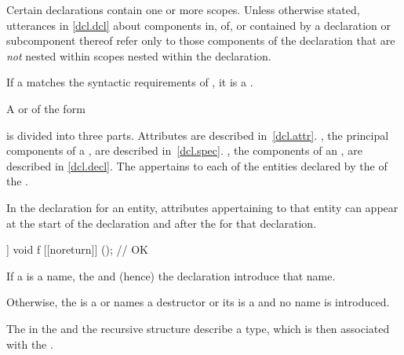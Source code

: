 \pnum
{}%
%
Certain declarations contain one or more scopes.
Unless otherwise stated, utterances in
\ref{dcl.dcl} about components in, of, or contained by a
declaration or subcomponent thereof refer only to those components of
the declaration that are \emph{not} nested within scopes nested within
the declaration.

\pnum
If a  matches
the syntactic requirements of ,
it is a .

\pnum
A
 or
 of the form
\begin{ncsimplebnf}
   \terminal{;}
\end{ncsimplebnf}
is divided into three parts.
Attributes are described in~\ref{dcl.attr}.
, the principal components of
a , are described in~\ref{dcl.spec}.
, the components of an
, are described in \ref{dcl.decl}.
The 
appertains to each of the entities declared by
the 
of the .
\begin{note}
In the declaration for an entity, attributes appertaining to that
entity can appear at the start of the declaration and after the
 for that declaration.
\end{note}
\begin{example}
\begin{codeblock}
[[noreturn]] void f [[noreturn]] ();    // OK
\end{codeblock}
\end{example}

\pnum
If a  is a name, the
 and (hence) the declaration introduce that name.
\begin{note}
Otherwise, the  is
a  or
names a destructor or
its  is a  and
no name is introduced.
\end{note}
The  in
the  and
the recursive  structure
describe a type,
which is then associated with the .

